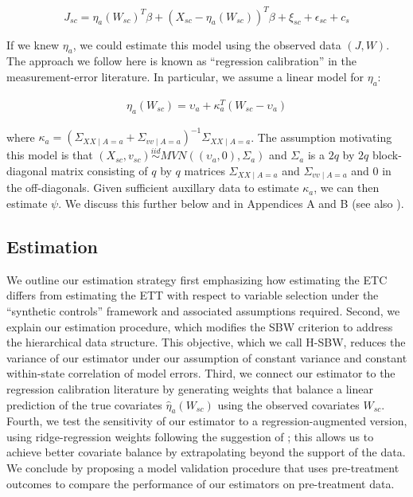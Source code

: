 \begin{equation}
    J_{sc} = \eta_a(W_{sc})^T\beta + (X_{sc} - \eta_a(W_{sc}))^T\beta + \xi_{sc} + \epsilon_{sc} + c_s 
\end{equation}

If we knew $\eta_a$, we could estimate this model using the observed data $(J, W)$. The approach we follow here is known as ``regression calibration'' in the measurement-error literature. In particular, we assume a linear model for $\eta_a$:

\begin{align*}
\eta_a(W_{sc}) = \upsilon_a + \kappa_a^T(W_{sc} - \upsilon_a)
\end{align*}

where $\kappa_a = (\Sigma_{XX \mid A = a} + \Sigma_{vv \mid A = a})^{-1}\Sigma_{XX \mid A = a}$. The assumption motivating this model is that $(X_{sc}, v_{sc}) \stackrel{iid}\sim MVN((\upsilon_a, 0), \Sigma_a)$ and $\Sigma_a$ is a $2q$ by $2q$ block-diagonal matrix consisting of $q$ by $q$ matrices $\Sigma_{XX \mid A = a}$ and $\Sigma_{vv \mid A = a}$ and $0$ in the off-diagonals. Given sufficient auxillary data to estimate $\kappa_a$, we can then estimate $\psi$. We discuss this further below and in Appendices A and B (see also \cite{gleser1992importance}).

\subsection{Estimation}

We outline our estimation strategy first emphasizing how estimating the ETC differs from estimating the ETT with respect to variable selection under the ``synthetic controls'' framework and associated assumptions required. Second, we explain our estimation procedure, which modifies the SBW criterion to address the hierarchical data structure. This objective, which we call H-SBW, reduces the variance of our estimator under our assumption of constant variance and constant within-state correlation of model errors. Third, we connect our estimator to the regression calibration literature by generating weights that balance a linear prediction of the true covariates $\hat{\eta}_a(W_{sc})$ using the observed covariates $W_{sc}$. Fourth, we test the sensitivity of our estimator to a regression-augmented version, using ridge-regression weights following the suggestion of \cite{ben2018augmented}; this allows us to achieve better covariate balance by extrapolating beyond the support of the data. We conclude by proposing a model validation procedure that uses pre-treatment outcomes to compare the performance of our estimators on pre-treatment data.

